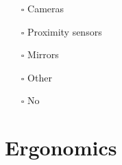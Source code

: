 \documentclass[
  12pt,
]{scrbook}
\providecommand{\tightlist}{%
  \setlength{\itemsep}{0pt}\setlength{\parskip}{0pt}}
\begin{document}
\begin{itemize}
  \begin{itemize}
  \tightlist
  \item[$\square$]
    Cameras
  \item[$\square$]
    Proximity sensors
  \item[$\square$]
    Mirrors
  \item[$\square$]
    Other
  \item[$\square$]
    No
  \end{itemize}
\end{itemize}

\hypertarget{ergonomics}{%
\section*{Ergonomics}\label{ergonomics}}
\end{document}
